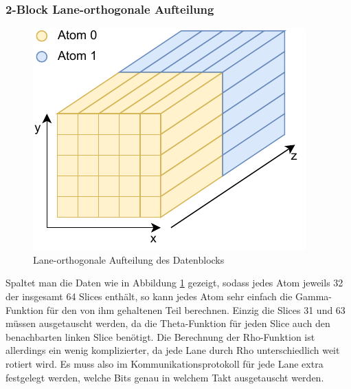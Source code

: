 \subsubsection{2-Block Lane-orthogonale Aufteilung}
\begin{figure}
    \center
    \includegraphics{images/Laneorthogonal.pdf}
    \caption{Lane-orthogonale Aufteilung des Datenblocks}
    \label{fig:2_block_laneorthogonal}
\end{figure}
Spaltet man die Daten wie in Abbildung \ref{fig:2_block_laneorthogonal} gezeigt, sodass jedes Atom jeweils 32 der insgesamt 64 Slices enthält,
so kann jedes Atom sehr einfach die Gamma-Funktion für den von ihm gehaltenen Teil berechnen. Einzig die Slices 31 und 63 müssen ausgetauscht werden,
da die Theta-Funktion für jeden Slice auch den benachbarten linken Slice benötigt. Die Berechnung der Rho-Funktion ist allerdings ein wenig komplizierter,
da jede Lane durch Rho unterschiedlich weit rotiert wird. Es muss also im Kommunikationsprotokoll für jede Lane extra festgelegt werden, welche Bits genau in welchem
Takt ausgetauscht werden.

